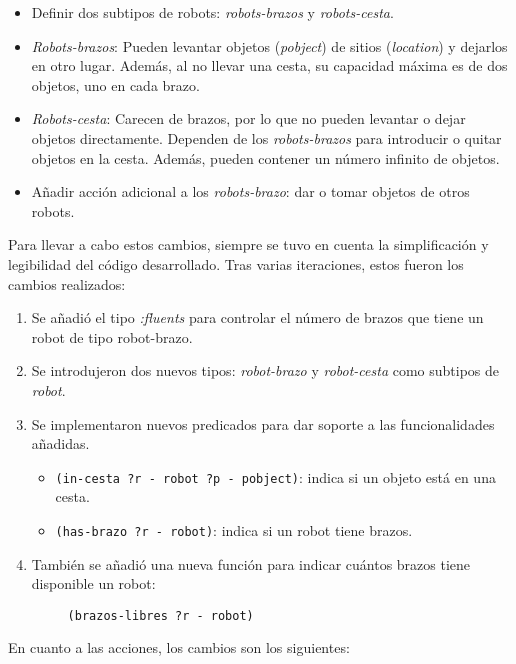 \documentclass{article}
\begin{document}
 \begin{itemize}
     \item Definir dos subtipos de robots: \textit{robots-brazos} y \textit{robots-cesta}.
     \item \textit{Robots-brazos}: Pueden levantar objetos (\textit{pobject}) de sitios (\textit{location}) y dejarlos en otro lugar. Además, al no llevar una cesta, su capacidad máxima es de dos objetos, uno en cada brazo.
     \item \textit{Robots-cesta}: Carecen de brazos, por lo que no pueden levantar o dejar objetos directamente. Dependen de los \textit{robots-brazos} para introducir o quitar objetos en la cesta. Además, pueden contener un número infinito de objetos.
     \item Añadir acción adicional a los \textit{robots-brazo}: dar o tomar objetos de otros robots.
 \end{itemize}
 
 Para llevar a cabo estos cambios, siempre se tuvo en cuenta la simplificación y legibilidad del código desarrollado. Tras varias iteraciones, estos fueron los cambios realizados:
 
 \begin{enumerate}
     \item Se añadió el tipo \textit{:fluents} para controlar el número de brazos que tiene un robot de tipo robot-brazo.
     \item Se introdujeron dos nuevos tipos: \textit{robot-brazo} y \textit{robot-cesta} como subtipos de \textit{robot}.
     \item Se implementaron nuevos predicados para dar soporte a las funcionalidades añadidas. 
 
 
 \begin{itemize}
     \item \texttt{(in-cesta ?r - robot ?p - pobject)}: indica si un objeto está en una cesta.
     \item \texttt{(has-brazo ?r - robot)}: indica si un robot tiene brazos.
 \end{itemize}
 
 \item También se añadió una nueva función para indicar cuántos brazos tiene disponible un robot:
 \begin{verbatim}
     (brazos-libres ?r - robot)
 \end{verbatim}
\end{enumerate}
 En cuanto a las acciones, los cambios son los siguientes:
 
\end{document}

